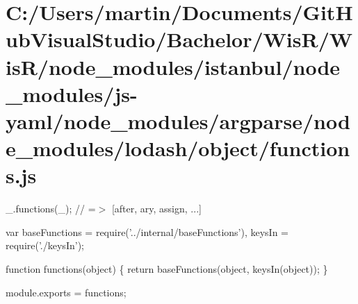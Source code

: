 \hypertarget{_c_1_2_users_2martin_2_documents_2_git_hub_visual_studio_2_bachelor_2_wis_r_2_wis_r_2node_module13877813c0f93181d6335d6b41fe60ce}{}\section{C\+:/\+Users/martin/\+Documents/\+Git\+Hub\+Visual\+Studio/\+Bachelor/\+Wis\+R/\+Wis\+R/node\+\_\+modules/istanbul/node\+\_\+modules/js-\/yaml/node\+\_\+modules/argparse/node\+\_\+modules/lodash/object/functions.\+js}
\+\_\+.\+functions(\+\_\+); // =$>$ \mbox{[}\textquotesingle{}after\textquotesingle{}, \textquotesingle{}ary\textquotesingle{}, \textquotesingle{}assign\textquotesingle{}, ...\mbox{]}


\begin{DoxyCodeInclude}
var baseFunctions = require(\textcolor{stringliteral}{'../internal/baseFunctions'}),
    keysIn = require(\textcolor{stringliteral}{'./keysIn'});

\textcolor{keyword}{function} functions(\textcolor{keywordtype}{object}) \{
  \textcolor{keywordflow}{return} baseFunctions(\textcolor{keywordtype}{object}, keysIn(\textcolor{keywordtype}{object}));
\}

module.exports = functions;
\end{DoxyCodeInclude}
 